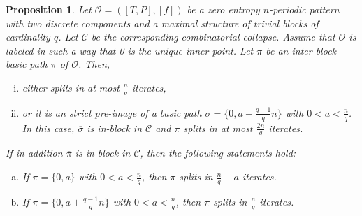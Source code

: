 \documentclass[a4paper]{amsart}
\newtheorem{proposition}[theorem]{Proposition}
\theoremstyle{definition}
\begin{document}
\begin{proposition}\label{bifurcacions}
Let $\mathcal{O}=([T,P],[f])$ be a zero entropy $n$-periodic pattern with two discrete components and a maximal structure of trivial blocks of cardinality $q$.
Let $\mathcal{C}$ be the corresponding combinatorial collapse. Assume that $\mathcal{O}$ is labeled in such a way that 0 is the unique inner point.
Let $\pi$ be an inter-block basic path $\pi$ of $\mathcal{O}$. Then,
\begin{enumerate}[(i)]
\item either splits in at most $\frac{n}{q}$ iterates,
\item or it is an strict pre-image of a basic path $\sigma=\{0,a+\frac{q-1}{q}n\}$ with $0<a<\frac{n}{q}$. In this case, $\overline{\sigma}$ is in-block in $\mathcal{C}$
and $\pi$ splits in at most $\frac{2n}{q}$ iterates.
\end{enumerate}
If in addition $\overline{\pi}$ is in-block in $\mathcal{C}$, then the following statements hold:
\begin{enumerate}[(a)]
\item If $\pi=\{0,a\}$ with $0<a<\frac{n}{q}$, then $\pi$ splits in $\frac{n}{q}-a$ iterates.
\item If $\pi=\{0,a+\tfrac{q-1}{q}n\}$ with $0<a<\frac{n}{q}$, then $\pi$ splits in $\frac{n}{q}$ iterates.
\end{enumerate}
\end{proposition}
\end{document}
